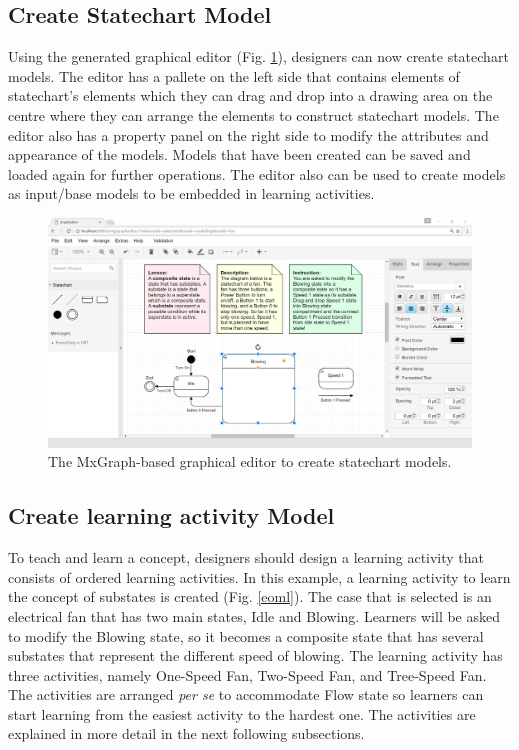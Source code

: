 \documentclass[conference]{IEEEtran}
\begin{document}
\subsection{Create Statechart Model}
Using the generated graphical editor (Fig. \ref{ide}), designers can now create statechart models. The editor has a pallete on the left side that contains elements of statechart's elements which they can drag and drop into a drawing area on the centre where they can arrange the elements to construct statechart models. The editor also has a property panel on the right side to modify the attributes and appearance of the models. Models that have been created can be saved and loaded again for further operations. The editor also can be used to create models as input/base models to be embedded in learning activities.        

\begin{figure}[!t]
\centering
\includegraphics[width=\linewidth]{ide}
\caption{The MxGraph-based graphical editor to create statechart models.}
\label{ide}
\end{figure}

\subsection{Create learning activity Model}
To teach and learn a concept, designers should design a learning activity that consists of ordered learning activities. In this example, a learning activity to learn the concept of substates is created (Fig. \ref{eoml}). The case that is selected is an electrical fan that has two main states, Idle and Blowing. Learners will be asked to modify the Blowing state, so it becomes a composite state that has several substates that represent the different speed of blowing. The learning activity has three activities, namely One-Speed Fan, Two-Speed Fan, and Tree-Speed Fan. The activities are arranged \textit{per se} to accommodate Flow state \cite{csikszentmihalyi2014toward} so learners can start learning from the easiest activity to the hardest one. The activities are explained in more detail in the next following subsections.
  
\end{document}
